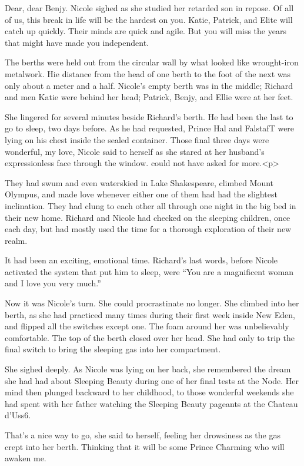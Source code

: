 \documentclass[]{article}
\begin{document}
{Dear, dear Benjy. Nicole sighed as she studied her retarded son in repose. Of all of us, this break in life will be the hardest on you. Katie, Patrick, and Elite will catch up quickly. Their minds are quick and agile. But you will miss the years that might have made you independent.

The berths were held out from the circular wall by what looked like wrought-iron metalwork. Hie distance from the head of one berth to the foot of the next was only about a meter and a half. Nicole’s empty berth was in the middle; Richard and men Katie were behind her head; Patrick, Benjy, and Ellie were at her feet.

She lingered for several minutes beside Richard’s berth. He had been the last to go to sleep, two days before. As he had requested, Prince Hal and FalstafT were lying on his chest inside the sealed container. Those final three days were wonderful, my love, Nicole said to herself as she stared at her husband’s expressionless face through the window. could not have asked for more.<p>

They had swum and even waterskied in Lake Shakespeare, climbed Mount Olympus, and made love whenever either one of them had had the slightest inclination. They had clung to each other all through one night in the big bed in their new home. Richard and Nicole had checked on the sleeping children, once each day, but had mostly used the time for a thorough exploration of their new realm.

It had been an exciting, emotional time. Richard’s last words, before Nicole activated the system that put him to sleep, were “You are a magnificent woman and I love you very much.”

Now it was Nicole’s turn. She could procrastinate no longer. She climbed into her berth, as she had practiced many times during their first week inside New Eden, and flipped all the switches except one. The foam around her was unbelievably comfortable. The top of the berth closed over her head. She had only to trip the final switch to bring the sleeping gas into her compartment.

She sighed deeply. As Nicole was lying on her back, she remembered the dream she had had about Sleeping Beauty during one of her final tests at the Node. Her mind then plunged backward to her childhood, to those wonderful weekends she had spent with her father watching the Sleeping Beauty pageants at the Chateau d’Uss6.

That’s a nice way to go, she said to herself, feeling her drowsiness as the gas crept into her berth. Thinking that it will be some Prince Charming who will awaken me.


}
\end{document}
